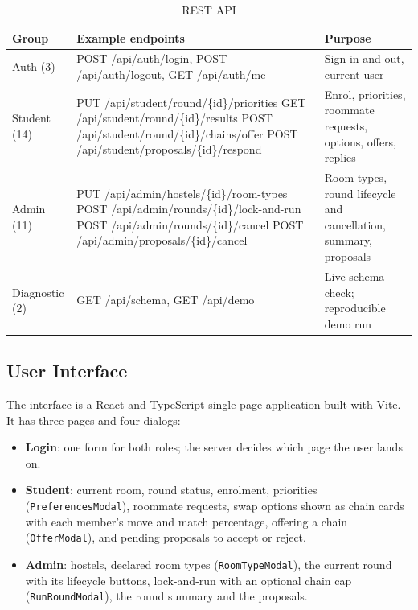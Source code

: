 \begin{table}[H]
\centering
\small
\begin{tabularx}{\textwidth}{>{\raggedright\arraybackslash}p{} >{\ttfamily\scriptsize\raggedright\arraybackslash}p{} L}
\toprule
\textbf{Group} & \textrm{\textbf{Example endpoints}} & \textbf{Purpose} \\
\midrule
Auth (3) & POST /api/auth/login, POST /api/auth/logout, GET /api/auth/me & Sign in and out, current user \\
Student (14) & PUT /api/student/round/\{id\}/priorities \newline GET /api/student/round/\{id\}/results \newline POST /api/student/round/\{id\}/chains/offer \newline POST /api/student/proposals/\{id\}/respond & Enrol, priorities, roommate requests, options, offers, replies \\
Admin (11) & PUT /api/admin/hostels/\{id\}/room-types \newline POST /api/admin/rounds/\{id\}/lock-and-run \newline POST /api/admin/rounds/\{id\}/cancel \newline POST /api/admin/proposals/\{id\}/cancel & Room types, round lifecycle and cancellation, summary, proposals \\
Diagnostic (2) & GET /api/schema, GET /api/demo & Live schema check; reproducible demo run \\
\bottomrule
\end{tabularx}
\caption{REST API}
\label{tab:api}
\end{table}

\subsection{User Interface}

The interface is a React and TypeScript single-page application built
with Vite. It has three pages and four dialogs:

\begin{itemize}
  \item \textbf{Login}: one form for both roles; the server decides which
  page the user lands on.
  \item \textbf{Student}: current room, round status, enrolment,
  priorities (\texttt{PreferencesModal}), roommate requests, swap options
  shown as chain cards with each member's move and match percentage,
  offering a chain (\texttt{OfferModal}), and pending
  proposals to accept or reject.
  \item \textbf{Admin}: hostels, declared room types
  (\texttt{RoomTypeModal}), the current round with its lifecycle buttons,
  lock-and-run with an optional chain cap (\texttt{RunRoundModal}), the
  round summary and the proposals.
\end{itemize}

